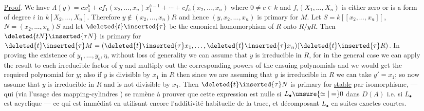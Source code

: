 \uline{Proof}. We have $\Lambda(y)=cx_1^b+cf_1(x_2,\ldots,x_n)x_1^{b-1}+\cdots+cf_b(x_2,\ldots,x_n)$ where $0\ne c\in k$ and $f_i(X_1,\ldots,X_n)$ is either zero or is a form of degree $i$ in $k[X_2,\ldots,X_n]$. Therefore $y\notin(x_2,\ldots,x_n)R$ and hence $(y,x_2,\ldots,x_n)$ is primary for $M$. Let $S=k[[x_2,\ldots,x_n]]$, $N=(x_2,\ldots,x_n)S$ and let $\deleted{t}\inserted{\tau}$ be the canonical homomorphism of $R$ onto $R/yR$. Then $\deleted{tN}\inserted{\tau N}$ is primary for $\deleted{t}\inserted{\tau}M=(\deleted{t}\inserted{\tau}x_1,\ldots,\deleted{t}\inserted{\tau}x_n)(\deleted{t}\inserted{\tau}R)$.
In proving the existence of $y_1,\ldots,y_b,\eta$, without loss of generality we can assume that $y$ is irreducible in $R$, for in the general case we can apply the result to each irreducible factor of $y$ and multiply out the corresponding powers of the ensuing polynomials and we would get the required polynomial for $y$; also if $y$ is divisible by $x_1$ in $R$ then since we are assuming that $y$ is irreducible in $R$ we can take $y'=x_1$; so now assume that $y$ is irreducible in $R$ and is not divisible by $x_1$. Then $\deleted{t}\inserted{\tau}N$ is primary for
\uline{stable} par isomorphisme, --- qui  (via l'usage des mapping-cylindres ) se ramène à prouver que cette expression est nulle si $L_\bullet\unsure{\simeq|=}0$ dans $D(A)$ i.e. si $L_\bullet$ est acyclique --- ce qui est immédiat en utilisant encore l'additivité habituelle de la trace, et décomposant $L_\bullet$ en suites exactes courtes.

